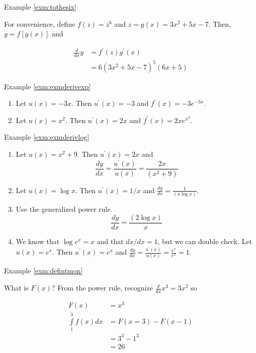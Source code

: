 \documentclass[]{book}
\providecommand{\tightlist}{%
  \setlength{\itemsep}{0pt}\setlength{\parskip}{0pt}}
\theoremstyle{definition}
\theoremstyle{definition}
\theoremstyle{definition}
\theoremstyle{remark}
\let\BeginKnitrBlock\begin \let\EndKnitrBlock\end
\begin{document}
Example \ref{exm:tothesix}

\BeginKnitrBlock{solution}
{}For convenience, define \(f(z) = z^6\) and \(z = g(x) = 3x^2+5x-7\). Then, \(y=f[g(x)]\) and

\begin{align*}
\frac{d}{dx}y&= f^\prime(z) g^\prime(x) \\
&= 6(3x^2+5x-7)^5 (6x + 5)
\end{align*}
\EndKnitrBlock{solution}

Example \ref{exm:exmderivexp}

\BeginKnitrBlock{solution}
{}

\begin{enumerate}
\def\labelenumi{\arabic{enumi}.}
\tightlist
\item
  Let \(u(x)=-3x\). Then \(u^\prime(x)=-3\) and \(f^\prime(x)=-3e^{-3x}\).
\item
  Let \(u(x)=x^2\). Then \(u^\prime(x)=2x\) and \(f^\prime(x)=2xe^{x^2}\).
\end{enumerate}
\EndKnitrBlock{solution}

Example \ref{exm:exmderivlog}

\BeginKnitrBlock{solution}
{}

\begin{enumerate}
\def\labelenumi{\arabic{enumi}.}
\tightlist
\item
  Let \(u(x)=x^2+9\). Then \(u^\prime(x)=2x\) and \[\frac{dy}{dx}= \frac{u^\prime(x)}{u(x)} = \frac{2x}{(x^2+9)}\]
\item
  Let \(u(x)=\log x\). Then \(u^\prime(x)=1/x\) and \(\frac{dy}{dx} = \frac{1}{(x\log x)}\).
\item
  Use the generalized power rule. \[\frac{dy}{dx} = \frac{(2 \log x)}{x}\]
\item
  We know that \(\log e^x=x\) and that \(dx/dx=1\), but we can double check. Let \(u(x)=e^x\). Then \(u^\prime(x)=e^x\) and \(\frac{dy}{dx} = \frac{u^\prime(x)}{u(x)} = \frac{e^x}{e^x} = 1.\)
\end{enumerate}
\EndKnitrBlock{solution}

Example \ref{exm:defintmon}

\BeginKnitrBlock{solution}
{}What is \(F(x)\)? From the power rule, recognize \(\frac{d}{dx}x^3 = 3x^2\) so

\begin{align*}
F(x) &= x^3\\
\int\limits_1^3 f(x) dx &= F(x = 3) - F(x  - 1)\\
&= 3^3 - 1^3\\
&=26
\end{align*}
\EndKnitrBlock{solution}
\end{document}
